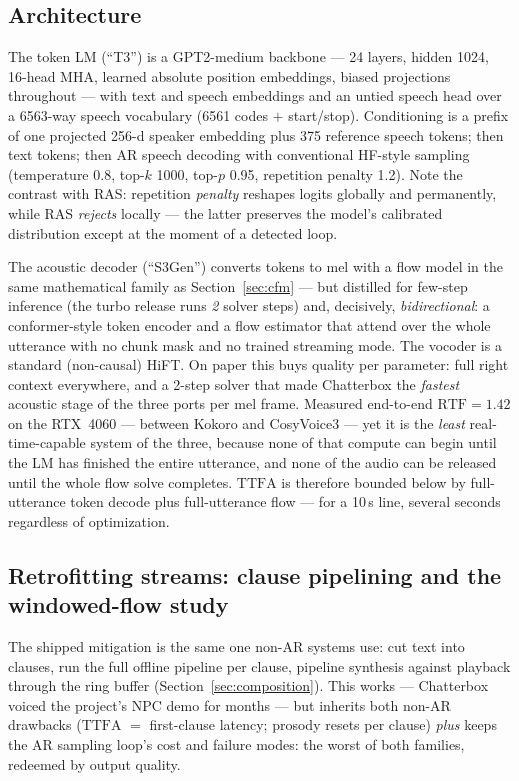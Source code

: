 \documentclass[11pt,a4paper]{article}
\newcommand{\RTF}{\ensuremath{\mathrm{RTF}}}
\newcommand{\TTFA}{\ensuremath{\mathrm{TTFA}}}
\begin{document}
\subsection{Architecture}

The token LM (``T3'') is a GPT2-medium backbone --- 24 layers, hidden 1024, 16-head MHA,
learned absolute position embeddings, biased projections throughout --- with text and
speech embeddings and an untied speech head over a 6563-way speech vocabulary
(6561 codes $+$ start/stop). Conditioning is a prefix of one projected 256-d speaker
embedding plus 375 reference speech tokens; then text tokens; then AR speech decoding
with conventional HF-style sampling (temperature 0.8, top-$k$ 1000, top-$p$ 0.95,
repetition penalty 1.2). Note the contrast with RAS: repetition \emph{penalty} reshapes
logits globally and permanently, while RAS \emph{rejects} locally --- the latter
preserves the model's calibrated distribution except at the moment of a detected loop.

The acoustic decoder (``S3Gen'') converts tokens to mel with a flow model in the same
mathematical family as Section~\ref{sec:cfm} --- but distilled for few-step inference
(the turbo release runs \emph{2} solver steps) and, decisively, \emph{bidirectional}: a
conformer-style token encoder and a flow estimator that attend over the whole utterance
with no chunk mask and no trained streaming mode. The vocoder is a standard
(non-causal) HiFT. On paper this buys quality per parameter: full right context
everywhere, and a 2-step solver that made Chatterbox the \emph{fastest} acoustic stage
of the three ports per mel frame. Measured end-to-end $\RTF = 1.42$ on the RTX~4060 ---
between Kokoro and CosyVoice3 --- yet it is the \emph{least} real-time-capable system of
the three, because none of that compute can begin until the LM has finished the entire
utterance, and none of the audio can be released until the whole flow solve completes.
\TTFA{} is therefore bounded below by full-utterance token decode plus full-utterance
flow --- for a 10\,s line, several seconds regardless of optimization.

\subsection{Retrofitting streams: clause pipelining and the windowed-flow study}
\label{sec:chatterbox-stream}

The shipped mitigation is the same one non-AR systems use: cut text into clauses, run
the full offline pipeline per clause, pipeline synthesis against playback through the
ring buffer (Section~\ref{sec:composition}). This works --- Chatterbox voiced the
project's NPC demo for months --- but inherits both non-AR drawbacks (\TTFA{} $=$
first-clause latency; prosody resets per clause) \emph{plus} keeps the AR sampling loop's
cost and failure modes: the worst of both families, redeemed by output quality.
\end{document}
